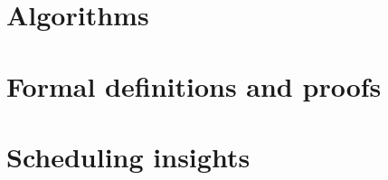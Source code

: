 \documentclass[USenglish,oneside,twocolumn]{article}
\begin{document}
\section{Algorithms}
\label{sec:algorithms}


\section{Formal definitions and proofs}
\label{sec:proof}



\section{Scheduling insights}
\label{sec:scheduling}


\end{document}

